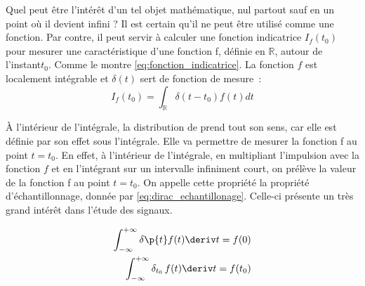 
	Quel peut être l'intérêt d'un tel objet mathématique, nul
        partout sauf en un point où il devient infini ? Il est certain
        qu'il ne peut être utilisé comme une fonction. Par contre, il
        peut servir à calculer une fonction indicatrice
        $I_{f}(t_0)$ pour mesurer une caractéristique d'une
        fonction f, définie en $\mathbb{R}$, autour de l'instant$t_0$.
        Comme le montre \eqref{eq:fonction_indicatrice}. La fonction $f$ est
        localement intégrable et $\delta(t)$ sert de fonction de mesure~:
	\begin{equation}\label{eq:fonction_indicatrice}
          I_{f}(t_0)=\int_{\mathbb{R}}\delta(t-t_0)f(t)dt
	\end{equation}
	
	À l'intérieur de l'intégrale, la distribution de \Dirac{}
        prend tout son sens, car elle est définie par son effet sous
        l'intégrale. Elle va permettre de mesurer la fonction f au
        point $t = t_0$. En effet, à l'intérieur de l'intégrale, en
        multipliant l'impulsion avec la fonction $f$ et en l'intégrant
        sur un intervalle infiniment court, on prélève la valeur de
        la fonction f au point $t = t_0$. On appelle cette propriété
        la propriété d'échantillonnage, donnée par
        \eqref{eq:dirac_echantillonage}. Celle-ci présente un très grand
        intérêt dans l'étude des signaux.
	
	 \begin{eqnarray}\label{eq:dirac_echantillonage}
           \int_{-\infty}^{+\infty} \delta\p{t}  f(t) \deriv t  = f(0)  \\ 
           \int_{-\infty}^{+\infty} \delta_{t_0}\, f(t) \deriv t  = f(t_0) \nonumber 
	 \end{eqnarray}
	
